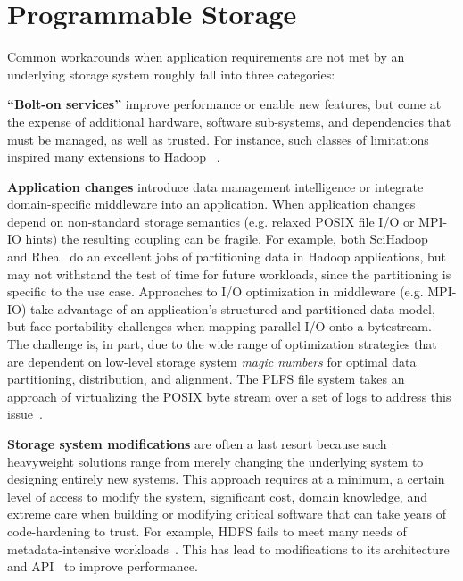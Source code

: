 \section{Programmable Storage}
\label{sec:progly}

Common workarounds when application requirements are not met
by an underlying storage system roughly fall into three categories:

{\bf ``Bolt-on services''} improve performance
or enable new features, but come at the expense of additional hardware, software
sub-systems, and dependencies that must be managed, as well as trusted.
For instance, such classes of limitations inspired many extensions to Hadoop
~\cite{bu:vldb2010-haloop, ekanayake:hpdc2010-twister,
ekanayake:escience2008-eglmapreduce, mihailescu:hotstorage2012-mixapart}.

{\bf Application changes} introduce data management intelligence or integrate
domain-specific middleware into an application.  When application changes
depend on non-standard storage semantics (e.g. relaxed POSIX file I/O or
MPI-IO hints) the resulting coupling can be fragile.  For example, both
SciHadoop~\cite{buck:hpc2011-scihadoop} and
Rhea~\cite{gkantsidis:nsdi2013-rhea} do an excellent jobs of partitioning data
in Hadoop applications, but may not withstand the test of time for future
workloads, since the partitioning is specific to the use case. Approaches to
I/O optimization in middleware (e.g.  MPI-IO) take advantage of an
application's structured and partitioned data model, but face portability
challenges when mapping parallel I/O onto a bytestream. The challenge is, in
part, due to the wide range of optimization strategies that are dependent on
low-level storage system \emph{magic numbers} for optimal data partitioning,
distribution, and alignment. The PLFS file system takes an approach of
virtualizing the POSIX byte stream over a set of logs to address this
issue~\cite{plfs}.

{\bf Storage system modifications} are often a last resort because such
heavyweight solutions range from merely changing the underlying system to
designing entirely new systems. This approach requires at a minimum, a certain level of
access to modify the system, significant cost, domain knowledge, and extreme care when building or
modifying critical software that can take years of code-hardening to trust.
For example, HDFS fails to meet many needs of metadata-intensive
workloads~\cite{shvachko:login2012-hdfs-scalability}.  This has lead to
modifications to its architecture and API~\cite{balmin:sigmod2012-clydesdale}
to improve performance.

